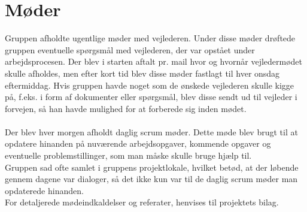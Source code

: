 \section{Møder}
Gruppen afholdte ugentlige møder med vejlederen. Under disse møder drøftede gruppen eventuelle spørgsmål med vejlederen, der var opstået under arbejdsprocesen.
Der blev i starten aftalt pr. mail hvor og hvornår vejledermødet skulle afholdes, men efter kort tid blev disse møder fastlagt til hver onsdag eftermiddag.
Hvis gruppen havde noget som de ønskede vejlederen skulle kigge på, f.eks. i form af dokumenter eller spørgsmål, blev disse sendt ud til vejleder i forvejen, så han havde mulighed for at forberede sig inden mødet. \\ \\
Der blev hver morgen afholdt daglig scrum møder\cite{Scrum}. Dette møde blev brugt til at opdatere hinanden på nuværende arbejdsopgaver, kommende opgaver og eventuelle problemstillinger, som man måske skulle bruge hjælp til. \\
Gruppen sad ofte samlet i gruppens projektlokale, hvilket betød, at der løbende gennem dagene var dialoger, så det ikke kun var til de daglig scrum møder man opdaterede hinanden. \\
For detaljerede mødeindkaldelser og referater, henvises til projektets bilag. \\

